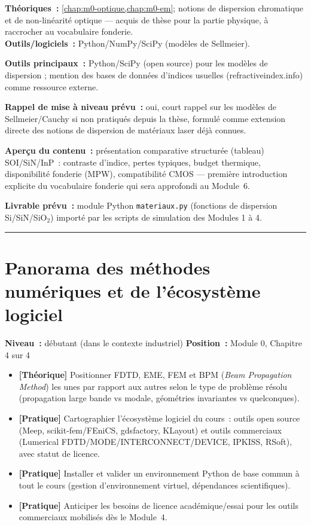 \begin{prerequis}
\textbf{Théoriques~:} \cref{chap:m0-optique,chap:m0-em}; notions de dispersion chromatique et de non-linéarité optique — acquis de thèse pour la partie physique, à raccrocher au vocabulaire fonderie.\\
\textbf{Outils/logiciels~:} Python/NumPy/SciPy (modèles de Sellmeier).
\end{prerequis}

\noindent\textbf{Outils principaux~:} Python/SciPy (open source) pour les modèles de dispersion ; mention des bases de données d'indices usuelles (refractiveindex.info) comme ressource externe.

\noindent\textbf{Rappel de mise à niveau prévu~:} oui, court rappel sur les modèles de Sellmeier/Cauchy si non pratiqués depuis la thèse, formulé comme extension directe des notions de dispersion de matériaux laser déjà connues.

\noindent\textbf{Aperçu du contenu~:} présentation comparative structurée (tableau) SOI/SiN/InP~: contraste d'indice, pertes typiques, budget thermique, disponibilité fonderie (MPW), compatibilité CMOS — première introduction explicite du vocabulaire fonderie qui sera approfondi au Module~6.

\noindent\textbf{Livrable prévu~:} module Python \texttt{materiaux.py} (fonctions de dispersion Si/SiN/SiO$_2$) importé par les scripts de simulation des Modules 1 à 4.

\bigskip
\hrule
\bigskip

\chapter{Panorama des méthodes numériques et de l'écosystème logiciel}
\label{chap:m0-panorama}

\noindent\textbf{Niveau~:} débutant (dans le contexte industriel) \hfill
\textbf{Position~:} Module 0, Chapitre 4 sur 4

\begin{objectifs}
\begin{itemize}[leftmargin=1.4em]
  \item \textbf{[Théorique]} Positionner FDTD, EME, FEM et BPM (\emph{Beam Propagation Method}) les unes par rapport aux autres selon le type de problème résolu (propagation large bande vs modale, géométries invariantes vs quelconques).
  \item \textbf{[Pratique]} Cartographier l'écosystème logiciel du cours~: outils open source (Meep, scikit-fem/FEniCS, gdsfactory, KLayout) et outils commerciaux (Lumerical FDTD/MODE/INTERCONNECT/DEVICE, IPKISS, RSoft), avec statut de licence.
  \item \textbf{[Pratique]} Installer et valider un environnement Python de base commun à tout le cours (gestion d'environnement virtuel, dépendances scientifiques).
  \item \textbf{[Pratique]} Anticiper les besoins de licence académique/essai pour les outils commerciaux mobilisés dès le Module~4.
\end{itemize}
\end{objectifs}

